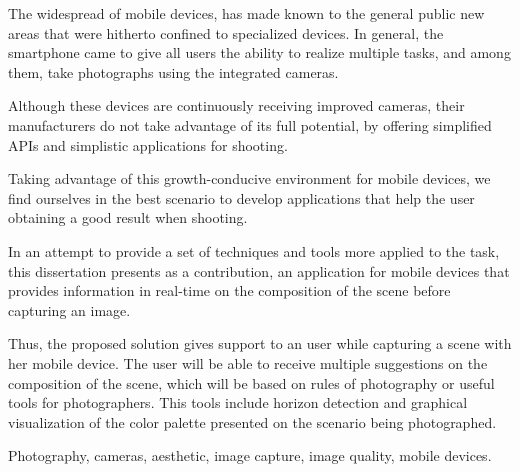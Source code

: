 \abstractEN
{}

The widespread of mobile devices, has made known to the general public new areas that were hitherto confined to specialized devices. In general, the smartphone came to give all users the ability to realize multiple tasks, and among them, take photographs using the integrated cameras.


Although these devices are continuously receiving improved cameras, their manufacturers do not take advantage of its full potential, by offering simplified APIs and simplistic applications for shooting.


Taking advantage of this growth-conducive environment for mobile devices, we find ourselves in the best scenario to develop applications that help the user obtaining a good result when shooting.


In an attempt to provide a set of techniques and tools more applied to the task, this dissertation presents as a contribution, an application for mobile devices that provides information in real-time on the composition of the scene before capturing an image.

Thus, the proposed solution gives support to an user while capturing a scene with her mobile device. The user will be able to receive multiple suggestions on the composition of the scene, which will be based on rules of photography or useful tools for photographers. This tools include horizon detection and graphical visualization of the color palette presented on the scenario being photographed.

\begin{keywords}
Photography, cameras, aesthetic, image capture, image quality, mobile devices.
\end{keywords}
